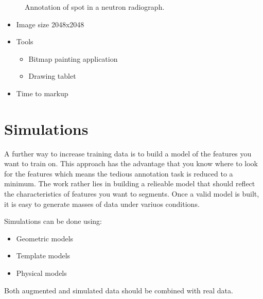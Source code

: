 \documentclass[letterpaper,10pt,english]{sphinxmanual}
\begin{document}
\begin{figure}[htbp]
\centering
\capstart

\noindent{}
\caption{Annotation of spot in a neutron radiograph.}\label{\detokenize{03-Datasets:id17}}\end{figure}


\begin{itemize}
\item {} 
\sphinxAtStartPar
Image size 2048x2048

\item {} 
\sphinxAtStartPar
Tools
\begin{itemize}
\item {} 
\sphinxAtStartPar
Bitmap painting application

\item {} 
\sphinxAtStartPar
Drawing tablet

\end{itemize}

\item {} 
\sphinxAtStartPar
Time to markup 

\end{itemize}


\section{Simulations}
\label{\detokenize{03-Datasets:simulations}}
\sphinxAtStartPar
A further way to increase training data is to build a model of the features you want to train on. This approach has the advantage that you know where to look for the features which means the tedious annotation task is reduced to a minimum. The work rather lies in building a relieable model that should reflect the characteristics of features you want to segments. Once a valid model is built, it is easy to generate masses of data under variuos conditions.

\sphinxAtStartPar
Simulations can be done using:
\begin{itemize}
\item {} 
\sphinxAtStartPar
Geometric models

\item {} 
\sphinxAtStartPar
Template models

\item {} 
\sphinxAtStartPar
Physical models

\end{itemize}

\sphinxAtStartPar
Both augmented and simulated data should be combined with real data.
\end{document}
